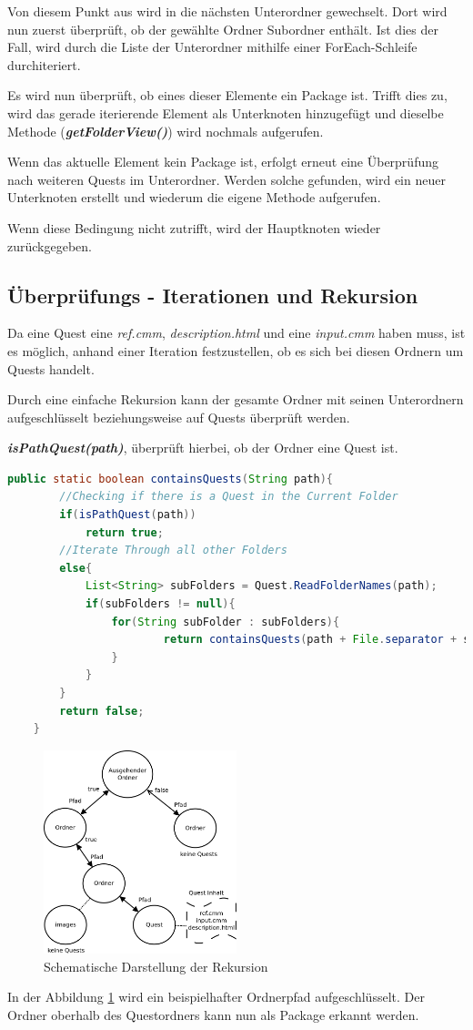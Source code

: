 Von diesem Punkt aus wird in die nächsten Unterordner gewechselt. Dort wird nun zuerst überprüft, ob der gewählte Ordner Subordner enthält. Ist dies der Fall, wird durch die Liste der Unterordner mithilfe einer ForEach-Schleife durchiteriert.

Es wird nun überprüft, ob eines dieser Elemente ein Package ist. Trifft dies zu, wird das gerade iterierende Element als Unterknoten hinzugefügt und dieselbe Methode (\textit{\textbf{getFolderView()}}) wird nochmals aufgerufen.

Wenn das aktuelle Element kein Package ist, erfolgt erneut eine Überprüfung nach weiteren Quests im Unterordner. Werden solche gefunden, wird ein neuer Unterknoten erstellt und wiederum die eigene Methode aufgerufen.

Wenn diese Bedingung nicht zutrifft, wird der Hauptknoten wieder zurückgegeben.

\subsection{Überprüfungs - Iterationen und Rekursion}
Da eine Quest eine \textit{ref.cmm}, \textit{description.html} und eine \textit{input.cmm} haben muss, ist es möglich, anhand einer Iteration festzustellen, ob es sich bei diesen Ordnern um Quests handelt.

Durch eine einfache Rekursion kann der gesamte Ordner mit seinen Unterordnern aufgeschlüsselt beziehungsweise auf Quests überprüft werden.

\textit{\textbf{isPathQuest(path)}}, überprüft hierbei, ob der Ordner eine Quest ist.
\begin{lstlisting}[language=JAVA]
	public static boolean containsQuests(String path){
		//Checking if there is a Quest in the Current Folder
		if(isPathQuest(path))
			return true;
		//Iterate Through all other Folders
		else{
			List<String> subFolders = Quest.ReadFolderNames(path);
			if(subFolders != null){
				for(String subFolder : subFolders){
						return containsQuests(path + File.separator + subFolder);
				}
			}
		}
		return false;
	}
\end{lstlisting}



\begin{figure}[h] 
  \centering
     \includegraphics[width=0.5\textwidth]{./media/images/gui/quest-control-rekursion.png}
  \caption{Schematische Darstellung der Rekursion}
  \label{fig:JTree_Control_Rekursion}
\end{figure}

In der Abbildung \ref{fig:JTree_Control_Rekursion} wird ein beispielhafter Ordnerpfad aufgeschlüsselt. Der Ordner oberhalb des Questordners kann nun als Package erkannt werden.